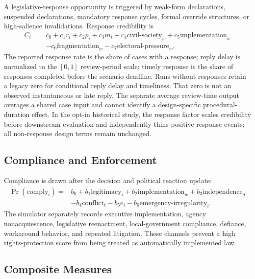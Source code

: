 A legislative-response opportunity is triggered by weak-form declarations, suspended declarations, mandatory response cycles, formal override structures, or high-salience invalidations. Response credibility is
\[
\begin{aligned}
C_i={}&c_0+c_1r_i+c_2p_i+c_3m_i
+c_4\text{civil-society}_w+c_5\text{implementation}_w\\
&-c_6\text{fragmentation}_w-c_7\text{electoral-pressure}_w.
\end{aligned}
\]
The reported response rate is the share of cases with a response; reply delay is normalized to the $[0,1]$ review-period scale; timely response is the share of responses completed before the scenario deadline. Runs without responses retain a legacy zero for conditional reply delay and timeliness. That zero is not an observed instantaneous or late reply. The separate average review-time output averages a shared case input and cannot identify a design-specific procedural-duration effect. In the opt-in historical study, the response factor scales credibility before downstream evaluation and independently thins positive response events; all non-response design terms remain unchanged.

\subsection*{Compliance and Enforcement}

Compliance is drawn after the decision and political reaction update:
\[
\begin{aligned}
\Pr(\text{comply}_i)={}&b_0+b_1\text{legitimacy}_i
+b_2\text{implementation}_w+b_3\text{independence}_d\\
&-b_4\text{conflict}_t-b_5e_i-b_6\text{emergency-irregularity}_i.
\end{aligned}
\]
The simulator separately records executive implementation, agency nonacquiescence, legislative reenactment, local-government compliance, defiance, workaround behavior, and repeated litigation. These channels prevent a high rights-protection score from being treated as automatically implemented law.

\subsection*{Composite Measures}

